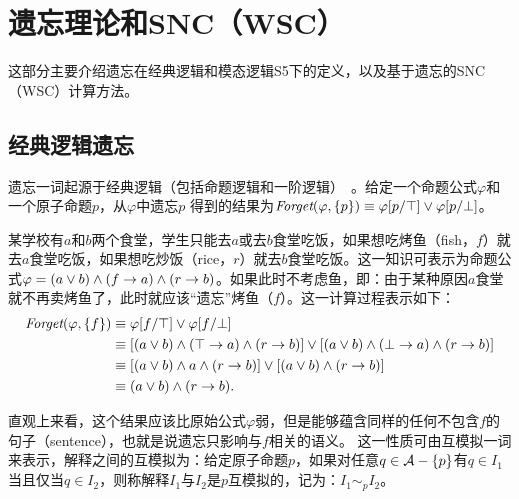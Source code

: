 \section{遗忘理论和SNC（WSC）}
这部分主要介绍遗忘在经典逻辑和模态逻辑S5下的定义，以及基于遗忘的SNC（WSC）计算方法。
\subsection{经典逻辑遗忘}\label{chapter:sub:proforgetting}
遗忘一词起源于经典逻辑（包括命题逻辑和一阶逻辑）~\cite{lin1994forget}。给定一个命题公式$\varphi$和一个原子命题$p$，从$\varphi$中遗忘$p$ 得到的结果为$\textit{Forget}(\varphi, \{p\}) \equiv \varphi[p/\top] \vee \varphi[p/\bot]$。


\begin{example}\label{exmp:fish}
	某学校有$a$和$b$两个食堂，学生只能去$a$或去$b$食堂吃饭，如果想吃烤鱼（fish，$f$）就去$a$食堂吃饭，如果想吃炒饭（rice，$r$）就去$b$食堂吃饭。这一知识可表示为命题公式$\varphi=(a \vee b) \wedge (f\rightarrow a) \wedge (r \rightarrow b)$。如果此时不考虑鱼，即：由于某种原因$a$食堂就不再卖烤鱼了，此时就应该“遗忘”烤鱼（$f$）。这一计算过程表示如下：
	\begin{align*}
		\textit{Forget}(\varphi, \{f\}) & \equiv \varphi[f/\top] \vee \varphi[f/\bot] \\
		& \equiv [(a \vee b) \wedge (\top \rightarrow a) \wedge (r \rightarrow b)] \vee  [(a \vee b) \wedge (\bot \rightarrow a) \wedge (r \rightarrow b)]\\
		& \equiv [(a \vee b) \wedge a \wedge (r \rightarrow b)] \vee  [(a \vee b) \wedge (r \rightarrow b)]\\
		& \equiv (a \vee b) \wedge (r \rightarrow b).
	\end{align*}
\end{example}

直观上来看，这个结果应该比原始公式$\varphi$弱，但是能够蕴含同样的任何不包含$f$的句子（sentence），也就是说遗忘只影响与$f$相关的语义。
这一性质可由互模拟一词来表示，解释之间的互模拟为：给定原子命题$p$，如果对任意$q\in {\cal A}-\{p\}$有$q \in I_1$当且仅当$q \in I_2$，则称解释$I_1$与$I_2$是$p$互模拟的，记为：$I_1 \sim_{p} I_2$。


